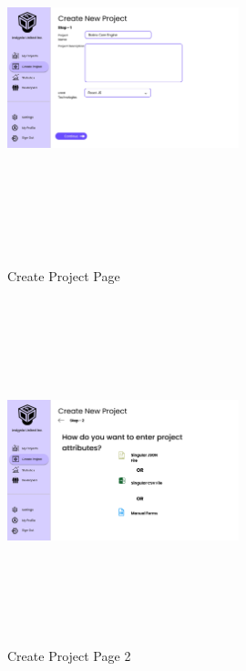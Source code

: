 \begin{figure}[H]
\includegraphics[height=10cm, width=0.6\textwidth]{./images/prototype/0010}
\centering 
\caption{Create Project Page}
\label{fig:prototype1}

\includegraphics[height=10cm, width=0.6\textwidth]{./images/prototype/0012}
\centering 
\caption{Create Project Page 2}
\label{fig:prototype1}
\end{figure}

